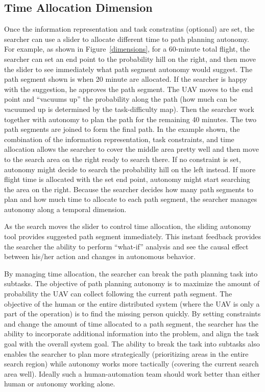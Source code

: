 \documentclass[journal]{IEEEtran}
\begin{document}
\subsection{Time Allocation Dimension}

Once the information representation and task constratins (optional) are set, the searcher can use a slider to allocate different time to path planning autonomy. For example, as shown in Figure~\ref{dimensions}, for a 60-minute total flight, the searcher can set an end point to the probability hill on the right, and then move the slider to see immediately what path segment autonomy would suggest. The path segment shown is when 20 minute are allocated. If the searcher is happy with the suggestion, he approves the path segment. The UAV moves to the end point and ``vacuums up'' the probability along the path (how much can be vacuumed up is determined by the task-difficulty map). Then the searcher work together with autonomy to plan the path for the remaining 40 minutes. The two path segments are joined to form the final path. In the example shown, the combination of the information representation, task constraints, and time allocation allows the searcher to cover the middle area pretty well and then move to the search area on the right ready to search there. If no constraint is set, autonomy might decide to search the probability hill on the left instead. If more flight time is allocated with the set end point, autonomy might start searching the area on the right. Because the searcher decides how many path segments to plan and how much time to allocate to each path segment, the searcher manages autonomy along a temporal dimension.

As the search moves the slider to control time allocation, the sliding autonomy tool provides suggested path segment immediately. This instant feedback provides the searcher the ability to perform ``what-if'' analysis and see the causal effect between his/her action and changes in autonomous behavior. 

By managing time allocation, the searcher can break the path planning task into subtasks. The objective of path planning autonomy is to maximize the amount of probability the UAV can collect following the current path segment. The objective of the human or the entire distributed system (where the UAV is only a part of the operation) is to find the missing person quickly. By setting constraints and change the amount of time allocated to a path segment, the searcher has the ability to incorporate additional information into the problem, and align the task goal with the overall system goal. The ability to break the task into subtasks also enables the searcher to plan more strategically (prioritizing areas in the entire search region) while autonomy works more tactically (covering the current search area well). Ideally such a human-automation team should work better than either human or autonomy working alone.
\end{document}
